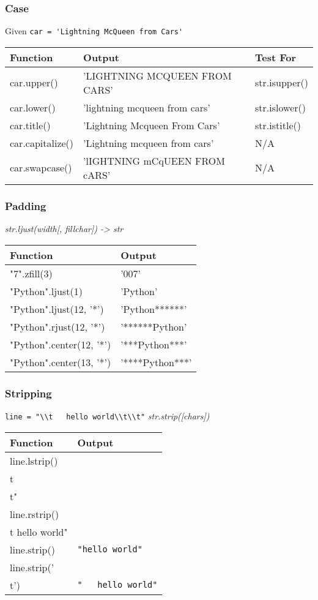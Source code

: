 \documentclass{beamer}
\begin{document}
%
%
\begin{frame}
  \frametitle{Case}
  Given \lstinline{car = 'Lightning McQueen from Cars'}
  \begin{table}
    \begin{tabular}{l | l | l}
    Function & Output & Test For \\
    \hline
    car.upper() & 'LIGHTNING MCQUEEN FROM CARS' & str.isupper() \\
    car.lower() & 'lightning mcqueen from cars' & str.islower() \\
    car.title() & 'Lightning Mcqueen From Cars' & str.istitle() \\
    car.capitalize() & 'Lightning mcqueen from cars' & N/A \\
    car.swapcase() & 'lIGHTNING mCqUEEN FROM cARS' & N/A
    \end{tabular}
  \end{table}
\end{frame}


%
%
\begin{frame}
  \frametitle{Padding}
  \textit{str.ljust(width[, fillchar]) -> str}
  \begin{table}
    \begin{tabular}{l | l}
    Function & Output \\
    \hline
    "7".zfill(3) & '007' \\
    "Python".ljust(1) & 'Python' \\
    "Python".ljust(12, '*') & 'Python******' \\
    "Python".rjust(12, '*') & '******Python' \\
    "Python".center(12, '*') & '***Python***' \\
    "Python".center(13, '*') & '****Python***'
    \end{tabular}
  \end{table}
\end{frame}


%
%
\begin{frame}
  \frametitle{Stripping}
  \lstinline{line = "\\t   hello world\\t\\t"}
  \textit{str.strip([chars])}
  \begin{table}
    \begin{tabular}{l | l}
    Function & Output \\
    \hline
    line.lstrip() & \lstinline{"hello world\\t\\t"} \\
    line.rstrip() & \lstinline{"\\t   hello world"} \\
    line.strip() & \lstinline{"hello world"} \\
    line.strip('\\t') & \lstinline{"   hello world"}
    \end{tabular}
  \end{table}
\end{frame}
\end{document}
